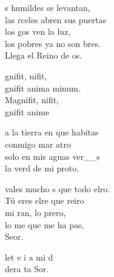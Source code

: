 \documentclass[12pt]{article}
\begin{document}
\begin{multicols*}{2}
\begin{cancion}%
	s humildes se levantan,\\
	las rceles abren sus puertas \\
	los gos ven la luz,\\
	los pobres ya no son bres.\\
	Llega el Reino de os.\\
\end{cancion}%

\begin{cancion}[Magnificat][Taizé]%
	gnifit, nifit,\\
	gnifit anima  minum.\\
	Magnifit, nifit,\\
	gnifit anime\\
\end{cancion}%

\begin{cancion}%
	a la tierra en que habitas\\
	 conmigo mar atro\\
	solo en mis aguas ver__s\\
	la verd de mi proto.\\
\end{cancion}%

\begin{cancion}%
	 vales mucho s que todo elro. \\
	Tú eres elre que reiro\\
	mi ran, lo prero, \\
	lo me que me ha pas,\\
	Seor.\\
\end{cancion}%

\begin{cancion}%
	 let e i a mi d  \\
	 dera ta Sor. \\
\end{cancion}%


\end{multicols*}
\end{document}
